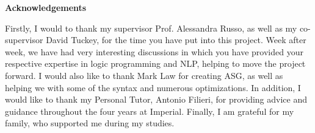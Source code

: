 \newenvironment{acknowledgements}%
    {\thispagestyle{empty}\null\vfill\begin{center}%
    \bfseries Acknowledgements\end{center}}%
    {\vfill\null}
        \begin{acknowledgements}
        Firstly, I would to thank my supervisor Prof. Alessandra Russo, as well as my co-supervisor David Tuckey, for the time you have put into this project. Week after week, we have had very interesting discussions in which you have provided your respective expertise in logic programming and NLP, helping to move the project forward. I would also like to thank Mark Law for creating ASG, as well as helping we with some of the syntax and numerous optimizations. In addition, I would like to thank my Personal Tutor, Antonio Filieri, for providing advice and guidance throughout the four years at Imperial. Finally, I am grateful for my family, who supported me during my studies.
        \end{acknowledgements}